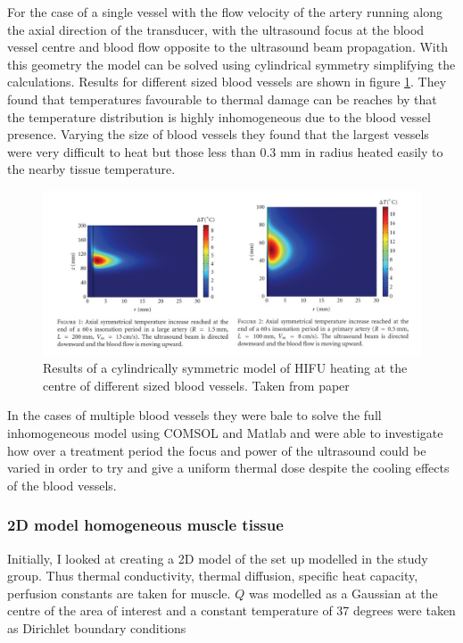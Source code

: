 \documentclass[11pt]{article} %
\begin{document}
\begin{itemize}
	For the case of a single vessel  with the flow velocity of the artery running along the axial direction of the transducer, with the ultrasound focus at the blood vessel centre and blood flow opposite to the ultrasound beam propagation. With this geometry the model can be solved using cylindrical symmetry simplifying the calculations.  Results for different sized blood vessels are shown in figure \ref{fig:sassaroli}. They found that temperatures favourable to thermal damage can be reaches by that the temperature distribution is highly inhomogeneous due to the blood vessel presence.  Varying the size of blood vessels they found that the largest vessels were very difficult to heat but those less than 0.3 mm in radius heated easily to the nearby tissue temperature.
	\begin{figure}
		\centering
		\includegraphics[width=\linewidth]{Report_images/sassaroli}
		\caption{Results of a cylindrically symmetric model of HIFU heating at the centre of different sized blood vessels. Taken from paper \cite{Sassaroli2012}}
		\label{fig:sassaroli}
	\end{figure}
	
	In the cases of multiple blood vessels they were bale to solve the full inhomogeneous model using COMSOL and Matlab and were able to investigate how over a treatment period the focus and power of the ultrasound could be varied in order to try and give a uniform thermal dose despite the cooling effects of the blood vessels.   
\end{itemize}





 
 \subsubsection{2D model homogeneous muscle tissue}
Initially, I looked at creating a 2D model of the set up modelled in the study group. Thus thermal conductivity, thermal diffusion, specific heat capacity, perfusion constants are taken for muscle.
$ Q $ was modelled as a Gaussian at the centre of the area of interest and a constant temperature of 37 degrees  were taken as Dirichlet boundary conditions 
\end{document}
